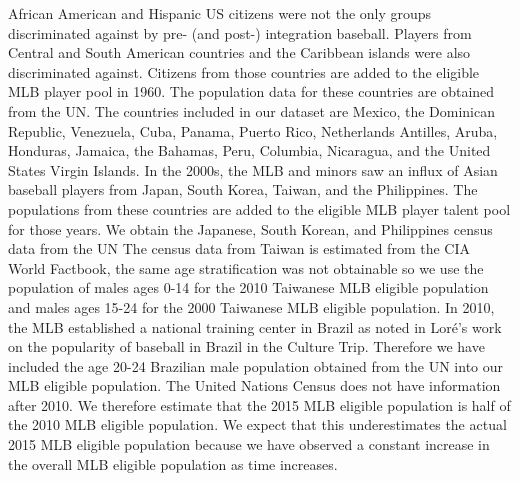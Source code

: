 \documentclass[11pt]{article}\usepackage[]{graphicx}\usepackage[]{color}
\begin{document}
African American and Hispanic US citizens were not the only groups 
discriminated against by pre- (and post-) integration baseball. Players from 
Central and South American countries and the Caribbean islands were also 
discriminated against.  Citizens from those countries are added to the 
eligible MLB player pool in 1960. The population data for these countries are 
obtained from the UN.  %
The countries included in our dataset are Mexico, the Dominican Republic, 
Venezuela, Cuba, Panama, Puerto Rico, Netherlands Antilles, Aruba, Honduras, 
Jamaica, the Bahamas, Peru, Columbia, Nicaragua, and the United States Virgin 
Islands.  In the 2000s, the MLB and minors saw an influx of Asian baseball 
players from Japan, South Korea, Taiwan, and the Philippines. The populations 
from these countries are added to the eligible MLB player talent pool for 
those years. We obtain the Japanese, South Korean, and Philippines census data 
from the UN %
The census data from Taiwan is estimated from the CIA World Factbook, %
the same age stratification was not obtainable so we use the population of 
males ages 0-14 for the 2010 Taiwanese MLB eligible population and males ages 
15-24 for the 2000 Taiwanese MLB eligible population.  In 2010, the MLB 
established a national training center in Brazil %
as noted in Lor{\'e}'s work on the popularity of baseball in Brazil in the 
Culture Trip.
Therefore we have included the age 20-24 Brazilian male 
population obtained from the UN %
into our MLB eligible population.  The United Nations Census does not have 
information after 2010.  We therefore estimate that the 2015 MLB eligible 
population is half of the 2010 MLB eligible population.  We expect that 
this underestimates the actual 2015 MLB eligible population because we 
have observed a constant increase in the overall MLB eligible population as 
time increases. 
\end{document}
